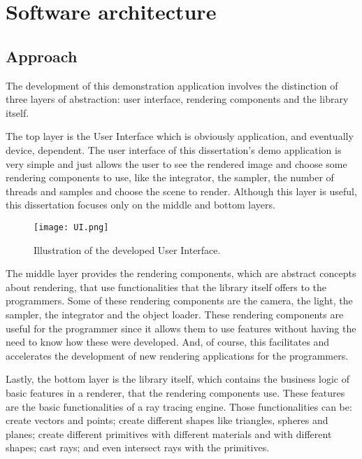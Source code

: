 \chapter{Software architecture}

\section{Approach}

\par
The development of this demonstration application involves the distinction of three layers of abstraction: user interface, rendering components and the library itself.

\par
The top layer is the User Interface which is obviously application, and eventually device, dependent.
The user interface of this dissertation's demo application is very simple and just allows the user to see the rendered image and choose some rendering components to use, like the integrator, the sampler, the number of threads and samples and choose the scene to render.
Although this layer is useful, this dissertation focuses only on the middle and bottom layers.

\begin{figure}[H]
	\centering
	\caption{Illustration of the developed User Interface.}
	\label{UI.}
	\texttt{[image: UI.png]}
\end{figure}

\par
The middle layer provides the rendering components, which are abstract concepts about rendering, that use functionalities that the library itself offers to the programmers.
Some of these rendering components are the camera, the light, the sampler, the integrator and the object loader.
These rendering components are useful for the programmer since it allows them to use features without having the need to know how these were developed.
And, of course, this facilitates and accelerates the development of new rendering applications for the programmers.

\par
Lastly, the bottom layer is the library itself, which contains the business logic of basic features in a renderer, that the rendering components use.
These features are the basic functionalities of a ray tracing engine.
Those functionalities can be: create vectors and points; create different shapes like triangles, spheres and planes; create different primitives with different materials and with different shapes; cast rays; and even intersect rays with the primitives.

